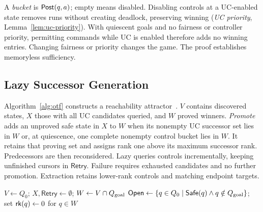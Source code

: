 A \emph{bucket} is $\mathsf{Post}(q,a)$; empty means disabled. Disabling controls at a UC-enabled state removes runs without creating deadlock, preserving winning (\emph{UC priority}, Lemma~\ref{lem:uc-priority}). With quiescent goals and no fairness or controller priority, permitting commands while UC is enabled therefore adds no winning entries. Changing fairness or priority changes the game. The proof establishes memoryless sufficiency.

\subsection{Lazy Successor Generation}\label{ta:lazy_algorithm}
Algorithm~\ref{alg:otf} constructs a reachability attractor~\cite{CassezEtAl2005TimedGames}. $V$ contains discovered states, $X$ those with all UC candidates queried, and $W$ proved winners. \emph{Promote} adds an unproved safe state in $X$ to $W$ when its nonempty UC successor set lies in $W$ or, at quiescence, one complete nonempty control bucket lies in $W$. It retains that proving set and assigns rank one above its maximum successor rank. Predecessors are then reconsidered. Lazy queries controls incrementally, keeping unfinished cursors in $\mathsf{Retry}$. Failure requires exhausted candidates and no further promotion. Extraction retains lower-rank controls and matching endpoint targets.

\begin{algorithm}[!htbp]
\caption{Lazy}
\label{alg:otf}
\footnotesize
{}
$V\leftarrow Q_0$; $X,\mathsf{Retry}\leftarrow\emptyset$; $W\leftarrow V\cap Q_{\mathrm{goal}}$\;
$\mathsf{Open}\leftarrow\{q\in Q_0\mid\mathsf{Safe}(q)\land q\notin Q_{\mathrm{goal}}\}$; set $\mathsf{rk}(q)\leftarrow0$ for $q\in W$\;
\end{algorithm}



